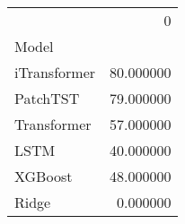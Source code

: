 \begin{tabular}{lr}
\toprule
 & 0 \\
Model &  \\
\midrule
iTransformer & 80.000000 \\
PatchTST & 79.000000 \\
Transformer & 57.000000 \\
LSTM & 40.000000 \\
XGBoost & 48.000000 \\
Ridge & 0.000000 \\
\bottomrule
\end{tabular}
